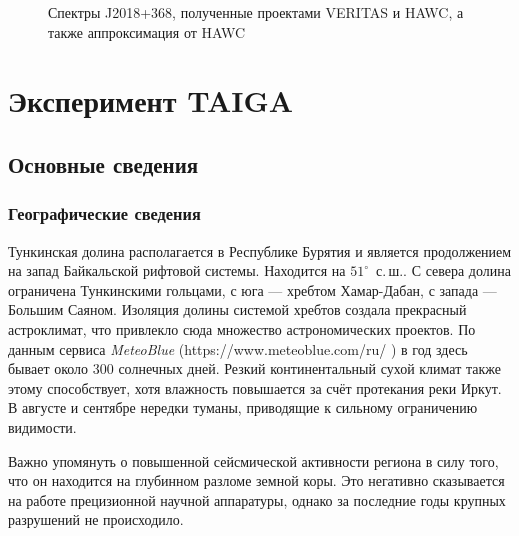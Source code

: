 \documentclass[magd,floatypics,numeref]{msudipl} %
\begin{document}
\begin{figure}[b]
	\noindent{}
	\caption{Спектры J2018+368, полученные проектами VERITAS и HAWC, а также аппроксимация от HAWC}
	\label{pic:HAWCJ2019368Spectra}
\end{figure}

\chapter{Эксперимент TAIGA}
\section{Основные сведения}
\subsection{Географические сведения}
Тункинская долина располагается в Республике Бурятия и является продолжением на запад Байкальской рифтовой системы.  Находится на $51^{\circ}$~с.\,ш.. С севера долина ограничена Тункинскими гольцами, с юга --- хребтом Хамар-Дабан, с запада --- Большим Саяном. Изоляция долины системой хребтов создала прекрасный астроклимат, что привлекло сюда множество астрономических проектов. По данным сервиса \textit{MeteoBlue} (https://www.meteoblue.com/ru/%
)
в год здесь бывает около 300 солнечных дней. Резкий континентальный сухой климат также этому способствует, хотя влажность повышается за счёт протекания реки Иркут. В августе и сентябре нередки туманы, приводящие к сильному ограничению видимости. 

Важно упомянуть о повышенной сейсмической активности региона в силу того, что он находится на глубинном разломе земной коры. Это негативно сказывается на работе прецизионной научной аппаратуры, однако за последние годы крупных разрушений не происходило.
\end{document}
